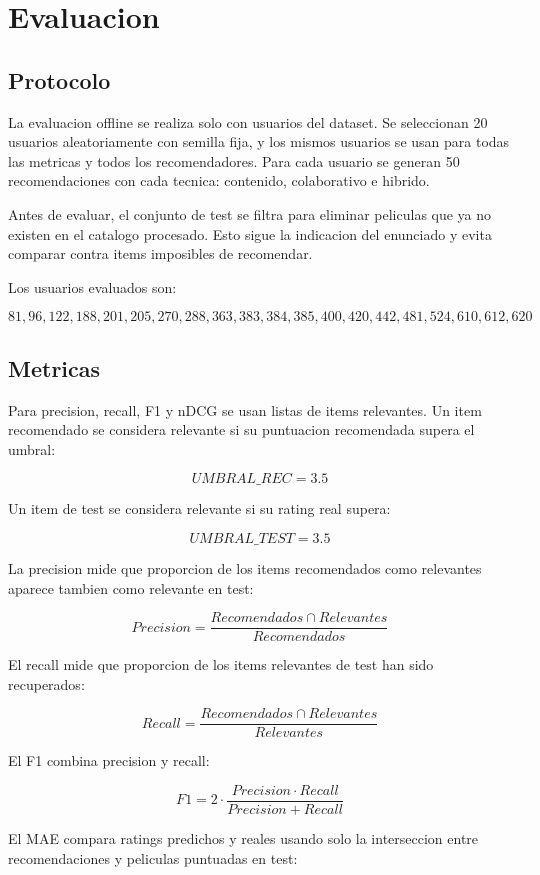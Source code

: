 \documentclass[12pt,a4paper]{article}
\begin{document}
\section{Evaluacion}

\subsection{Protocolo}

La evaluacion offline se realiza solo con usuarios del dataset. Se seleccionan 20 usuarios aleatoriamente con semilla fija, y los mismos usuarios se usan para todas las metricas y todos los recomendadores. Para cada usuario se generan 50 recomendaciones con cada tecnica: contenido, colaborativo e hibrido.

Antes de evaluar, el conjunto de test se filtra para eliminar peliculas que ya no existen en el catalogo procesado. Esto sigue la indicacion del enunciado y evita comparar contra items imposibles de recomendar.

Los usuarios evaluados son:

\[
81, 96, 122, 188, 201, 205, 270, 288, 363, 383, 384, 385, 400, 420, 442, 481, 524, 610, 612, 620
\]

\subsection{Metricas}

Para precision, recall, F1 y nDCG se usan listas de items relevantes. Un item recomendado se considera relevante si su puntuacion recomendada supera el umbral:

\[
UMBRAL\_REC = 3.5
\]

Un item de test se considera relevante si su rating real supera:

\[
UMBRAL\_TEST = 3.5
\]

La precision mide que proporcion de los items recomendados como relevantes aparece tambien como relevante en test:

\[
Precision = \frac{Recomendados \cap Relevantes}{Recomendados}
\]

El recall mide que proporcion de los items relevantes de test han sido recuperados:

\[
Recall = \frac{Recomendados \cap Relevantes}{Relevantes}
\]

El F1 combina precision y recall:

\[
F1 = 2 \cdot \frac{Precision \cdot Recall}{Precision + Recall}
\]

El MAE compara ratings predichos y reales usando solo la interseccion entre recomendaciones y peliculas puntuadas en test:
\end{document}
